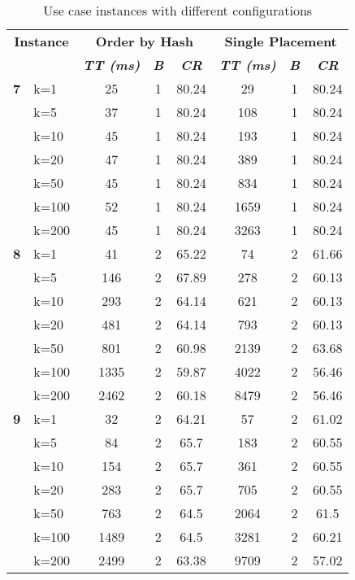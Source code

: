 \begin{table}[htbp]
    \caption{Use case instances with different configurations}
    \begin{tabular}{ll|ccc|ccc}
    
    \multicolumn{ 2}{c|}{\textbf{Instance}} & \multicolumn{ 3}{c|}{\textbf{Order by Hash}} & \multicolumn{ 3}{c}{\textbf{Single Placement}} \\ 
    \multicolumn{ 2}{l|}{} & \textbf{\textit{TT (ms)}} & \textbf{\textit{B}} & \textbf{\textit{CR}} & \textbf{\textit{TT (ms)}} & \textbf{\textit{B}} & \textbf{\textit{CR}} \\ \hline
    \multicolumn{1}{r}{\textbf{7}} & k=1 & 25 & 1 & 80.24 & 29 & 1 & 80.24 \\ 
     & k=5 & 37 & 1 & 80.24 & 108 & 1 & 80.24 \\ 
     & k=10 & 45 & 1 & 80.24 & 193 & 1 & 80.24 \\ 
     & k=20 & 47 & 1 & 80.24 & 389 & 1 & 80.24 \\ 
     & k=50 & 45 & 1 & 80.24 & 834 & 1 & 80.24 \\ 
     & k=100 & 52 & 1 & 80.24 & 1659 & 1 & 80.24 \\ 
     & k=200 & 45 & 1 & 80.24 & 3263 & 1 & 80.24 \\ \hline
    \multicolumn{1}{r}{\textbf{8}} & k=1 & 41 & 2 & 65.22 & 74 & 2 & 61.66 \\ 
     & k=5 & 146 & 2 & 67.89 & 278 & 2 & 60.13 \\ 
     & k=10 & 293 & 2 & 64.14 & 621 & 2 & 60.13 \\ 
     & k=20 & 481 & 2 & 64.14 & 793 & 2 & 60.13 \\ 
     & k=50 & 801 & 2 & 60.98 & 2139 & 2 & 63.68 \\ 
     & k=100 & 1335 & 2 & 59.87 & 4022 & 2 & 56.46 \\ 
     & k=200 & 2462 & 2 & 60.18 & 8479 & 2 & 56.46 \\ \hline
    \multicolumn{1}{r}{\textbf{9}} & k=1 & 32 & 2 & 64.21 & 57 & 2 & 61.02 \\ 
     & k=5 & 84 & 2 & 65.7 & 183 & 2 & 60.55 \\ 
     & k=10 & 154 & 2 & 65.7 & 361 & 2 & 60.55 \\ 
     & k=20 & 283 & 2 & 65.7 & 705 & 2 & 60.55 \\ 
     & k=50 & 763 & 2 & 64.5 & 2064 & 2 & 61.5 \\ 
     & k=100 & 1489 & 2 & 64.5 & 3281 & 2 & 60.21 \\ 
     & k=200 & 2499 & 2 & 63.38 & 9709 & 2 & 57.02 \\ \hline

\end{tabular}
\end{table}
